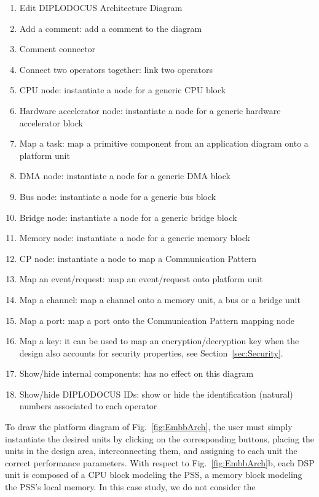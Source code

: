 \documentclass{llncs}
\begin{document}
\begin{enumerate}
	\item Edit DIPLODOCUS Architecture Diagram
	\item Add a comment: add a comment to the diagram
	\item Comment connector
	\item Connect two operators together: link two operators
	\item CPU node: instantiate a node for a generic CPU block
	\item Hardware accelerator node: instantiate a node for a generic hardware accelerator block
	\item Map a task: map a primitive component from an application diagram onto a platform unit
	\item DMA node: instantiate a node for a generic DMA block
	\item Bus node: instantiate a node for a generic bus block
	\item Bridge node: instantiate a node for a generic bridge block
	\item Memory node: instantiate a node for a generic memory block
	\item CP node: instantiate a node to map a Communication Pattern
	\item Map an event/request: map an event/request onto platform unit
	\item Map a channel: map a channel onto a memory unit, a bus or a bridge unit
	\item Map a port: map a port onto the Communication Pattern mapping node
	\item Map a key: it can be used to map an encryption/decryption key when the design also accounts for security
        properties, see Section~\ref{sec:Security}.
	\item Show/hide internal components: has no effect on this diagram
	\item Show/hide DIPLODOCUS IDs: show or hide the identification (natural) numbers associated to each operator
\end{enumerate}
%
To draw the platform diagram of Fig.~\ref{fig:EmbbArch}, the user must simply instantiate the desired units by clicking on
the corresponding buttons, placing the units in the design area, interconnecting them, and assigning to each unit the
correct performance parameters. With respect to Fig.~\ref{fig:EmbbArch}b, each DSP unit is composed of a CPU block
modeling the PSS, a memory block modeling the PSS's local memory. In this case study, we do not consider the
\end{document}
